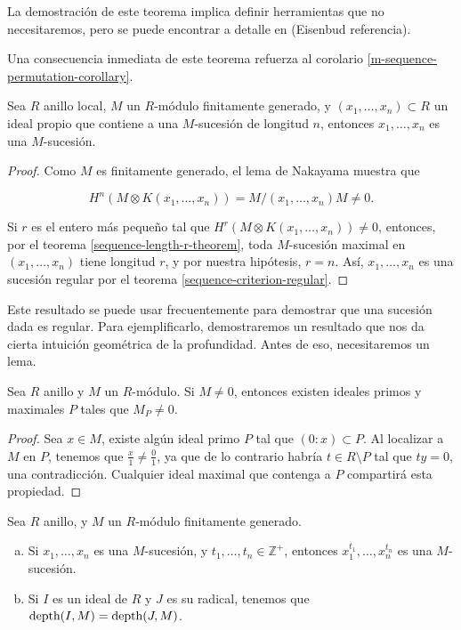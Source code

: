 La demostración de este teorema implica definir herramientas que no necesitaremos, pero se puede encontrar a detalle en (Eisenbud referencia).

Una consecuencia inmediata de este teorema refuerza al corolario \ref{m-sequence-permutation-corollary}.

\begin{corollary}\label{m-sequence-from-another-criteria}
Sea $R$ anillo local, $M$ un $R$-módulo finitamente generado, y $(x_1,\dots,x_n) \subset R$ un ideal propio que contiene a una $M$-sucesión de longitud $n$, entonces $x_1,\dots,x_n$ es una $M$-sucesión.
\end{corollary}

\begin{proof}
Como $M$ es finitamente generado, el lema de Nakayama muestra que 

$$H^n(M \otimes K(x_1,\dots,x_n)) = M/(x_1,\dots,x_n)M \neq 0.$$

Si $r$ es el entero más pequeño tal que $H^r(M\otimes K(x_1,\dots,x_n)) \neq 0$, entonces, por el teorema \ref{sequence-length-r-theorem}, toda $M$-sucesión maximal en $(x_1,\dots,x_n)$ tiene longitud $r$, y por nuestra hipótesis, $r = n$. Así, $x_1,\dots,x_n$ es una sucesión regular por el teorema \ref{sequence-criterion-regular}.
\end{proof}

Este resultado se puede usar frecuentemente para demostrar que una sucesión dada es regular. Para ejemplificarlo, demostraremos un resultado que nos da cierta intuición geométrica de la profundidad. Antes de eso, necesitaremos un lema.

\begin{lemma}\label{localized-module-not-zero}
Sea $R$ anillo y $M$ un $R$-módulo. Si $M \neq 0$, entonces existen ideales primos y maximales $P$ tales que $M_P \neq 0$.
\end{lemma}

\begin{proof}
Sea $x \in M$, existe algún ideal primo $P$ tal que $(0:x) \subset P$. Al localizar a $M$ en $P$, tenemos que $\frac{x}{1} \neq \frac{0}{1}$, ya que de lo contrario habría $t \in R\setminus P$ tal que $ty = 0$, una contradicción. Cualquier ideal maximal que contenga a $P$ compartirá esta propiedad.
\end{proof}

\begin{corollary}\label{geometry-nature-depth}
Sea $R$ anillo, y $M$ un $R$-módulo finitamente generado.
\begin{enumerate}[a.]
\item Si $x_1,\dots,x_n$ es una $M$-sucesión, y $t_1,\dots,t_n \in \mathbb{Z}^+$, entonces $x_1^{t_1},\dots,x_n^{t_n}$ es una $M$-sucesión.
\item Si $I$ es un ideal de $R$ y $J$ es su radical, tenemos que $\textrm{depth}(I,M) = \textrm{depth}(J, M)$.
\end{enumerate}
\end{corollary}

